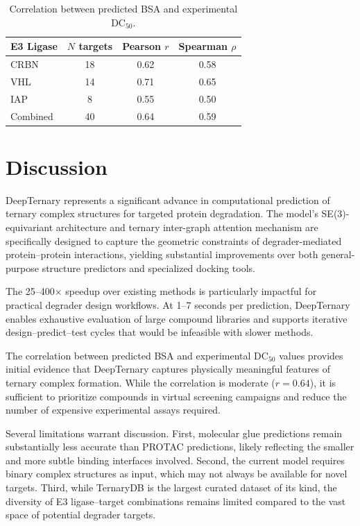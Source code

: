 \documentclass[11pt]{article}
\begin{document}
\begin{table}[h]
\centering
\caption{Correlation between predicted BSA and experimental DC$_{50}$.}
\label{tab:bsa}
\begin{tabular}{lccc}
\toprule
E3 Ligase & $N$ targets & Pearson $r$ & Spearman $\rho$ \\
\midrule
CRBN & 18 & 0.62 & 0.58 \\
VHL & 14 & 0.71 & 0.65 \\
IAP & 8 & 0.55 & 0.50 \\
Combined & 40 & 0.64 & 0.59 \\
\bottomrule
\end{tabular}
\end{table}

\section{Discussion}

DeepTernary represents a significant advance in computational prediction of ternary complex structures for targeted protein degradation. The model's SE(3)-equivariant architecture and ternary inter-graph attention mechanism are specifically designed to capture the geometric constraints of degrader-mediated protein--protein interactions, yielding substantial improvements over both general-purpose structure predictors and specialized docking tools.

The 25--400$\times$ speedup over existing methods is particularly impactful for practical degrader design workflows. At 1--7 seconds per prediction, DeepTernary enables exhaustive evaluation of large compound libraries and supports iterative design--predict--test cycles that would be infeasible with slower methods.

The correlation between predicted BSA and experimental DC$_{50}$ values provides initial evidence that DeepTernary captures physically meaningful features of ternary complex formation. While the correlation is moderate ($r = 0.64$), it is sufficient to prioritize compounds in virtual screening campaigns and reduce the number of expensive experimental assays required.

Several limitations warrant discussion. First, molecular glue predictions remain substantially less accurate than PROTAC predictions, likely reflecting the smaller and more subtle binding interfaces involved. Second, the current model requires binary complex structures as input, which may not always be available for novel targets. Third, while TernaryDB is the largest curated dataset of its kind, the diversity of E3 ligase--target combinations remains limited compared to the vast space of potential degrader targets.
\end{document}
